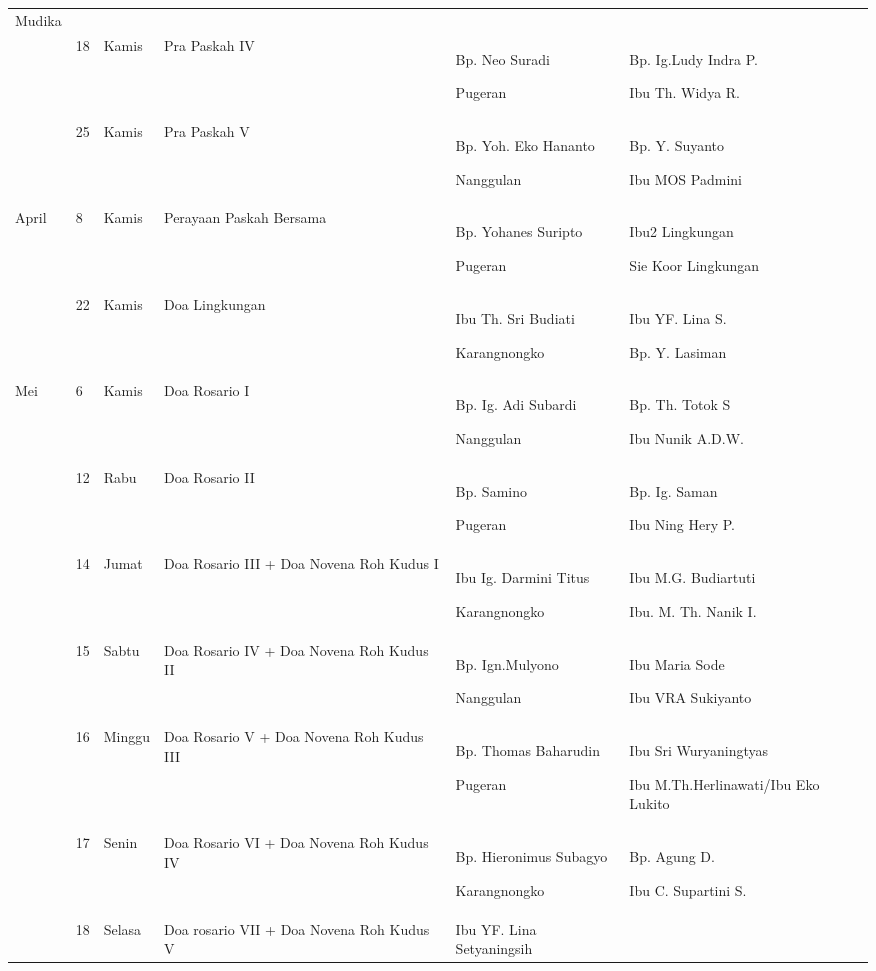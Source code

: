 \begin{longtable}{|p{1.2cm}|p{0.4cm}|p{0.8cm}|p{2.5cm}|p{3cm}|p{3cm}|}
Mudika\\\hhline{~-----}
 &
18 &
Kamis &
Pra Paskah IV &
Bp. Neo Suradi

Pugeran &
Bp. Ig.Ludy Indra P.

Ibu Th. Widya R.\\\hhline{~-----}
 &
25 &
Kamis &
Pra Paskah V &
Bp. Yoh. Eko Hananto

Nanggulan &
Bp. Y. Suyanto

Ibu MOS Padmini\\\hline
\multicolumn{1}{|p{0.9cm}|}{April} &
8 &
Kamis &
Perayaan Paskah Bersama &
Bp. Yohanes Suripto

Pugeran &
Ibu2 Lingkungan

Sie Koor  Lingkungan\\\hhline{~-----}
 &
22 &
Kamis &
Doa Lingkungan &
Ibu Th. Sri Budiati

Karangnongko &
Ibu YF. Lina S.

Bp. Y. Lasiman\\\hline
\multicolumn{1}{|p{0.9cm}|}{Mei} &
6 &
Kamis &
Doa Rosario I &
Bp. Ig. Adi Subardi

Nanggulan &
Bp. Th. Totok S

Ibu Nunik A.D.W.\\\hhline{~-----}
 &
12 &
Rabu &
Doa Rosario II &
Bp. Samino

Pugeran &
Bp. Ig. Saman

Ibu Ning Hery P.\\\hhline{~-----}
 &
14 &
Jumat &
Doa Rosario III + Doa Novena Roh Kudus I &
Ibu Ig. Darmini Titus

Karangnongko &
Ibu M.G. Budiartuti

Ibu. M. Th. Nanik I.\\\hhline{~-----}
 &
15 &
Sabtu &
Doa Rosario IV + Doa Novena Roh Kudus II &
Bp. Ign.Mulyono

Nanggulan &
Ibu Maria Sode

Ibu VRA Sukiyanto\\\hhline{~-----}
 &
16 &
Minggu &
Doa Rosario V + Doa Novena Roh Kudus III &
Bp. Thomas Baharudin

Pugeran &
Ibu Sri Wuryaningtyas

Ibu M.Th.Herlinawati/Ibu Eko Lukito\\\hhline{~-----}
 &
17 &
Senin &
Doa Rosario VI + Doa Novena Roh Kudus IV &
Bp. Hieronimus Subagyo

Karangnongko &
Bp. Agung D.

Ibu C. Supartini S.\\\hhline{~-----}
 &
18 &
Selasa &
Doa rosario VII + Doa Novena Roh Kudus V &
Ibu YF. Lina Setyaningsih


\end{longtable}
